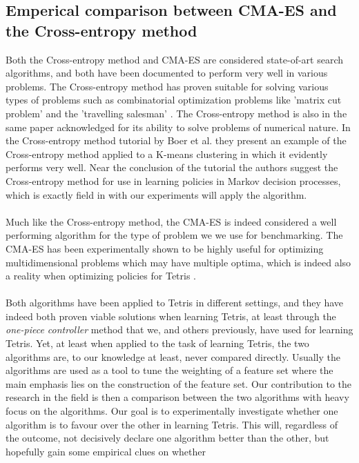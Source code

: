 \subsection{Emperical comparison between CMA-ES and the Cross-entropy method}

Both the Cross-entropy method and CMA-ES are considered state-of-art
search algorithms, and both have been documented to perform very well
in various problems. The Cross-entropy method has proven 
suitable for solving various types of problems such as 
combinatorial optimization problems like 'matrix cut problem'
and the 'travelling salesman' \citep{cetut2014}. 
The Cross-entropy method is also in the same paper acknowledged for
its ability to solve problems of numerical nature. In the 
Cross-entropy method tutorial by Boer et al. they present 
an example of the Cross-entropy method applied to 
a K-means clustering in which it evidently performs very well.
Near the conclusion of the tutorial the authors suggest the 
Cross-entropy method for use in learning policies in Markov decision 
processes, which is exactly field in with our experiments will apply the
algorithm.\\
\\
Much like the Cross-entropy method, the CMA-ES is indeed considered
a well performing algorithm for the type of problem we we use for benchmarking.
The CMA-ES has been experimentally shown to be highly useful for optimizing multidimensional
problems which may have multiple optima, which is indeed also a reality when 
optimizing policies for Tetris \citep{hansen2004}.\\
\\
Both algorithms have been applied to Tetris in different settings, and they have
indeed both proven viable solutions when learning Tetris, at least through the
\textit{one-piece controller} method that we, and others previously, have used
for learning Tetris. Yet, at least when applied to the task of learning Tetris,
the two algorithms are, to our knowledge at least, never compared directly. Usually
the algorithms are used as a tool to tune the weighting of a feature set where the
main emphasis lies on the construction of the feature set. Our contribution to 
the research in the field is then a comparison between the two algorithms
with heavy focus on the algorithms. Our goal is to experimentally investigate
whether one algorithm is to favour over the other in learning Tetris.
This will, regardless of the outcome, not decisively declare one algorithm 
better than the other, but hopefully gain some empirical clues on whether 
